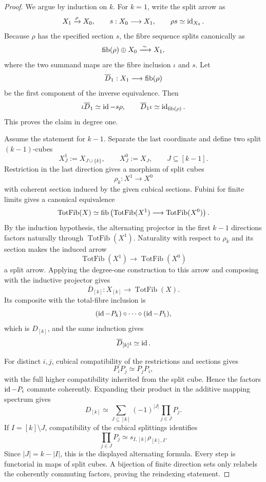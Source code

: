 \begin{proof}
We argue by induction on \(k\). For \(k=1\), write the split arrow as
\[
    X_1\xrightarrow{\rho}X_0,
    \qquad
    s:X_0\longrightarrow X_1,
    \qquad
    \rho s\simeq\operatorname{id}_{X_0}.
\]
Because \(\rho\) has the specified section \(s\), the fibre sequence splits canonically as
\[
    \operatorname{fib}(\rho)\oplus X_0
    \xrightarrow{\;\sim\;}
    X_1,
\]
where the two summand maps are the fibre inclusion \(\iota\) and \(s\). Let
\[
    \overline D_1:X_1\longrightarrow\operatorname{fib}(\rho)
\]
be the first component of the inverse equivalence. Then
\[
    \iota\overline D_1\simeq\operatorname{id}-s\rho,
    \qquad
    \overline D_1\iota\simeq\operatorname{id}_{\operatorname{fib}(\rho)}.
\]
This proves the claim in degree one.

Assume the statement for \(k-1\). Separate the last coordinate and define two split \((k-1)\)-cubes
\[
    X^1_J:=X_{J\cup\{k\}},
    \qquad
    X^0_J:=X_J,
    \qquad
    J\subseteq[k-1].
\]
Restriction in the last direction gives a morphism of split cubes
\[
    \rho_k:X^1\longrightarrow X^0
\]
with coherent section induced by the given cubical sections. Fubini for finite limits gives a canonical equivalence
\[
    \operatorname{TotFib}(X)
    \simeq
    \operatorname{fib}\left(
      \operatorname{TotFib}(X^1)
      \longrightarrow
      \operatorname{TotFib}(X^0)
    \right).
\]
By the induction hypothesis, the alternating projector in the first \(k-1\) directions factors naturally through \(\operatorname{TotFib}(X^1)\). Naturality with respect to \(\rho_k\) and its section makes the induced arrow
\[
    \operatorname{TotFib}(X^1)
    \longrightarrow
    \operatorname{TotFib}(X^0)
\]
a split arrow. Applying the degree-one construction to this arrow and composing with the inductive projector gives
\[
    \overline D_{[k]}:
    X_{[k]}\longrightarrow\operatorname{TotFib}(X).
\]
Its composite with the total-fibre inclusion is
\[
    (\operatorname{id}-P_k)\circ\cdots\circ(\operatorname{id}-P_1),
\]
which is \(D_{[k]}\), and the same induction gives
\[
    \overline D_{[k]}\iota\simeq\operatorname{id}.
\]

For distinct \(i,j\), cubical compatibility of the restrictions and sections gives
\[
    P_iP_j\simeq P_jP_i,
\]
with the full higher compatibility inherited from the split cube. Hence the factors \(\operatorname{id}-P_i\) commute coherently. Expanding their product in the additive mapping spectrum gives
\[
    D_{[k]}
    \simeq
    \sum_{J\subseteq[k]}
    (-1)^{|J|}
    \prod_{j\in J}P_j.
\]
If \(I=[k]\setminus J\), compatibility of the cubical splittings identifies
\[
    \prod_{j\in J}P_j
    \simeq
    s_{I,[k]}\rho_{[k],I}.
\]
Since \(|J|=k-|I|\), this is the displayed alternating formula. Every step is functorial in maps of split cubes. A bijection of finite direction sets only relabels the coherently commuting factors, proving the reindexing statement.
\end{proof}

